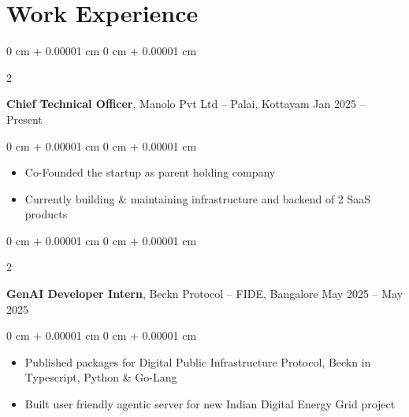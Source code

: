 \documentclass[10pt, letterpaper]{article}
\newenvironment{highlights}{
    \begin{itemize}[
        topsep=0.10 cm,
        parsep=0.10 cm,
        partopsep=0pt,
        itemsep=0pt,
        leftmargin=0 cm + 10pt
    ]
}{
    \end{itemize}
} %
\newenvironment{onecolentry}{
    \begin{adjustwidth}{
        0 cm + 0.00001 cm
    }{
        0 cm + 0.00001 cm
    }
}{
    \end{adjustwidth}
} %
\newenvironment{twocolentry}[2][]{
    \onecolentry
    \def\secondColumn{#2}
    \setcolumnwidth{\fill, 4.5 cm}
    \begin{paracol}{2}
}{
    \switchcolumn \raggedleft \secondColumn
    \end{paracol}
    \endonecolentry
} %
\begin{document}

\section{Work Experience}

\begin{twocolentry}{
		Jan 2025 – Present
	}
	\textbf{Chief Technical Officer}, Manolo Pvt Ltd -- Palai, Kottayam\end{twocolentry}

\vspace{0.10 cm}
\begin{onecolentry}
	\begin{highlights}
		\item Co-Founded the startup as parent holding company
		\item Currently building \& maintaining infrastructure and backend of 2 SaaS products
	\end{highlights}
\end{onecolentry}

\vspace{0.2 cm}

\begin{twocolentry}{
		May 2025 – May 2025
	}
	\textbf{GenAI Developer Intern}, Beckn Protocol -- FIDE, Bangalore\end{twocolentry}

\vspace{0.10 cm}
\begin{onecolentry}
	\begin{highlights}
		\item Published packages for Digital Public Infrastructure Protocol, Beckn in Typescript, Python \& Go-Lang
		\item Built user friendly agentic server for new Indian Digital Energy Grid project
	\end{highlights}
\end{onecolentry}

\vspace{0.2 cm}
\end{document}
